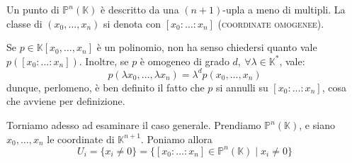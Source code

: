 \begin{defn}
Un punto di $\mathbb{P}^n(\mathbb{K})$ è descritto da una $(n+1)$-upla a meno di multipli. La classe di $(x_0,\dots,x_n)$ si denota con $[x_0: \dots:x_n]$ (\textsc{coordinate omogenee}).
\end{defn}

\begin{oss}
Se $p \in \mathbb{K}[x_0,\dots,x_n]$ è un polinomio, non ha senso chiedersi quanto vale $p([x_0: \dots:x_n])$. Inoltre, se $p$ è omogeneo di grado $d,\ \forall \lambda \in \mathbb{K}^*$, vale:
$$p(\lambda x_0,\dots,\lambda x_n)=\lambda ^d p(x_0,\dots,x_n)$$
dunque, perlomeno, è ben definito il fatto che $p$ si annulli su $[x_0: \dots:x_n]$, cosa che avviene per definizione.
\end{oss} 

Torniamo adesso ad esaminare il caso generale. Prendiamo $\mathbb{P}^n(\mathbb{K})$, e siano $x_0,\dots,x_n$ le coordinate di $\mathbb{K}^{n+1}$. Poniamo allora
$$U_i=\{x_i \neq 0\}=\{[x_0: \dots : x_n] \in \mathbb{P}^n(\mathbb{K}) \mid x_i \neq 0\}$$

